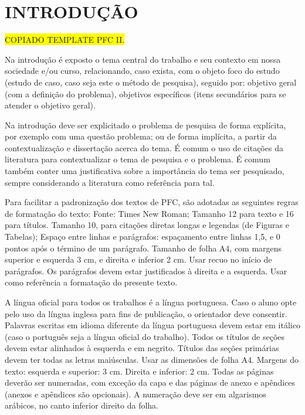
\chapter{INTRODUÇÃO} %
\label{introducao}

\colorbox{yellow}{COPIADO TEMPLATE PFC II.}

Na introdução é exposto o tema central do trabalho e seu contexto em nossa sociedade e/ou curso, relacionando, caso exista, com o objeto foco do estudo (estudo de caso, caso seja este o método de pesquisa), seguido por: objetivo geral (com a definição do problema), objetivos específicos (itens secundários para se atender o objetivo geral).

Na introdução deve ser explicitado o problema de pesquisa de forma explícita, por exemplo com uma questão problema; ou de forma implícita, a partir da contextualização e dissertação acerca do tema. É comum o uso de citações da literatura para contextualizar o tema de pesquisa e o problema. É comum também conter uma justificativa sobre a importância do tema ser pesquisado, sempre considerando a literatura como referência para tal.

Para facilitar a padronização dos textos de PFC, são adotadas as seguintes regras de formatação do texto: Fonte: Times New Roman; Tamanho 12 para texto e 16 para títulos. Tamanho 10, para citações diretas longas e legendas (de Figuras e Tabelas); Espaço entre linhas e parágrafos: espaçamento entre linhas 1,5, e 0 pontos após o término de um parágrafo. Tamanho de folha A4, com margens superior e esquerda 3 cm, e direita e inferior 2 cm. Usar recuo no início de parágrafos. Os parágrafos devem estar justificados à direita e a esquerda. Usar como referência a formatação do presente texto.

A língua oficial para todos os trabalhos é a língua portuguesa. Caso o aluno opte pelo uso da língua inglesa para fins de publicação, o orientador deve consentir. Palavras escritas em idioma diferente da língua portuguesa devem estar em itálico (caso o português seja a língua oficial do trabalho). Todos os títulos de seções devem estar alinhados à esquerda e em negrito. Títulos das seções primárias devem ter todas as letras maiúsculas. Usar as dimensões de folha A4. Margens do texto: esquerda e superior: 3 cm. Direita e inferior: 2 cm.
Todas as páginas deverão ser numeradas, com exceção da capa e das páginas de anexo e apêndices (anexos e apêndices são opcionais). A numeração deve ser em algarismos arábicos, no canto inferior direito da folha.

